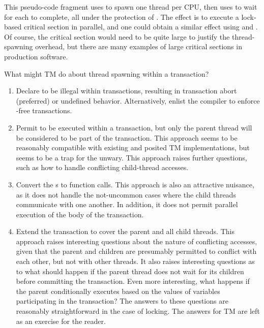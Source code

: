 This pseudo-code fragment uses  to spawn one thread
per CPU, then uses  to wait for each to complete,
all under the protection of .
The effect is to execute a lock-based critical section in parallel,
and one could obtain a similar effect using  and .
Of course, the critical section would need to be quite large to justify
the thread-spawning overhead, but there are many examples of large
critical sections in production software.

What might TM do about thread spawning within a transaction?

\begin{enumerate}
\item	Declare  to be illegal within transactions,
	resulting in transaction abort (preferred) or undefined
	behavior. Alternatively, enlist the compiler to enforce
	-free transactions.
\item	Permit  to be executed within a
	transaction, but only the parent thread will be considered to
	be part of the transaction.
	This approach seems to be reasonably compatible with existing and
	posited TM implementations, but seems to be a trap for the unwary.
	This approach raises further questions, such as how to handle
	conflicting child-thread accesses.
\item	Convert the s to function calls.
	This approach is also an attractive nuisance, as it does not
	handle the not-uncommon cases where the child threads communicate
	with one another.
	In addition, it does not permit parallel execution of the body
	of the transaction.
\item	Extend the transaction to cover the parent and all child threads.
	This approach raises interesting questions about the nature of
	conflicting accesses, given that the parent and children are
	presumably permitted to conflict with each other, but not with
	other threads.
	It also raises interesting questions as to what should happen
	if the parent thread does not wait for its children before
	committing the transaction.
	Even more interesting, what happens if the parent conditionally
	executes  based on the values of variables
	participating in the transaction?
	The answers to these questions are reasonably straightforward
	in the case of locking.
	The answers for TM are left as an exercise for the reader.
\end{enumerate}

